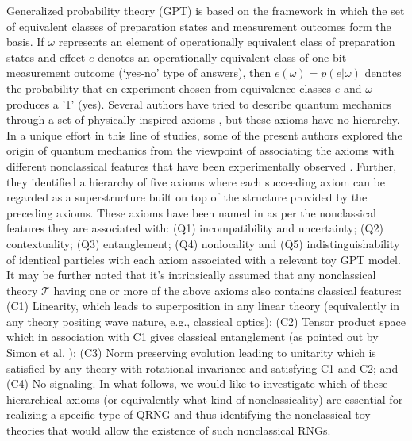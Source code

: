 \documentclass[]{interact}
\theoremstyle{plain}%
\theoremstyle{definition}
\theoremstyle{remark}
\begin{document}
Generalized probability theory (GPT) \cite{janotta2014generalized,barrett2007information} is based on the framework in which the set of equivalent classes of preparation states and measurement outcomes form the basis. If $\omega$ represents an element of operationally equivalent class of preparation states and effect $e$ denotes  an operationally equivalent  class of one bit measurement outcome (`yes-no' type of answers), then $e(\omega)=p(e|\omega)$ denotes the probability that en experiment chosen from equivalence classes $e$ and $\omega$ produces a '1' (yes). Several authors have tried to describe quantum mechanics through a set of physically inspired axioms \cite{barrett2007information,hardy2001quantum}, but these axioms have no hierarchy. In a unique effort in this line of studies, some of the present authors explored the origin of quantum mechanics from the viewpoint of associating the axioms with different nonclassical features that have been experimentally observed \cite{aravinda2019hierarchical}. Further, they identified a hierarchy of five axioms where each succeeding axiom can be regarded as a superstructure built on top of the structure provided by the preceding axioms. These axioms have been named in as per the nonclassical features they are associated with: (Q1) incompatibility and uncertainty; (Q2) contextuality; (Q3) entanglement; (Q4) nonlocality and (Q5) indistinguishability of identical particles with each axiom associated with a relevant toy GPT model. It may be further noted that it's intrinsically assumed that any nonclassical theory $\mathcal{T}$  having one or more of the above axioms also contains classical features: (C1) Linearity, which leads to superposition in any linear theory (equivalently in any theory positing wave nature, e.g., classical optics); (C2) Tensor product space which in association with C1 gives classical entanglement (as pointed out by Simon et al. \cite{simon2010nonquantum}); (C3) Norm preserving evolution leading to unitarity which is satisfied by any theory with rotational invariance and satisfying C1 and C2; and (C4) No-signaling. In what follows, we would like to investigate which of these hierarchical axioms (or equivalently what kind of nonclassicality) are essential for realizing a specific type of QRNG and thus identifying the nonclassical toy theories that would allow the existence of such nonclassical RNGs.
\end{document}
